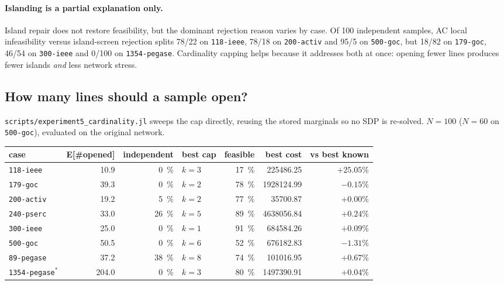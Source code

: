 \documentclass[11pt]{article}
\newcommand{\code}[1]{\texttt{\small #1}}
\begin{document}
\paragraph{Islanding is a partial explanation only.} Island repair does not restore feasibility, but the
dominant rejection reason varies by case. Of 100 independent samples, AC local infeasibility versus
island-screen rejection splits 78/22 on \code{118-ieee}, 78/18 on \code{200-activ} and 95/5 on
\code{500-goc}, but 18/82 on \code{179-goc}, 46/54 on \code{300-ieee} and 0/100 on \code{1354-pegase}.
Cardinality capping helps because it addresses both at once: opening fewer lines produces fewer islands
\emph{and} less network stress.

\subsection{How many lines should a sample open?}\label{sec:cardinality}

\code{scripts/experiment5\_cardinality.jl} sweeps the cap directly, reusing the stored marginals so no SDP
is re-solved. $N=100$ ($N=60$ on \code{500-goc}), evaluated on the original network.

\begin{table}[h]\centering
\begin{tabular}{lrrlrrr}
\toprule
case & E[\#opened] & independent & best cap & feasible & best cost & vs best known \\
\midrule
\code{118-ieee}  & 10.9 & \SI{0}{\percent}  & $k{=}3$ & \SI{17}{\percent} & \num{225486.25}  & $+25.05\%$ \\
\code{179-goc}   & 39.3 & \SI{0}{\percent}  & $k{=}2$ & \SI{78}{\percent} & \num{1928124.99} & $\mathbf{-0.15\%}$ \\
\code{200-activ} & 19.2 & \SI{5}{\percent}  & $k{=}2$ & \SI{77}{\percent} & \num{35700.87}   & $+0.00\%$ \\
\code{240-pserc} & 33.0 & \SI{26}{\percent} & $k{=}5$ & \SI{89}{\percent} & \num{4638056.84} & $+0.24\%$ \\
\code{300-ieee}  & 25.0 & \SI{0}{\percent}  & $k{=}1$ & \SI{91}{\percent} & \num{684584.26}  & $+0.09\%$ \\
\code{500-goc}   & 50.5 & \SI{0}{\percent}  & $k{=}6$ & \SI{52}{\percent} & \num{676182.83}  & $\mathbf{-1.31\%}$ \\
\code{89-pegase} & 37.2 & \SI{38}{\percent} & $k{=}8$ & \SI{74}{\percent} & \num{101016.95}  & $+0.67\%$ \\
\code{1354-pegase}$^{*}$ & 204.0 & \SI{0}{\percent} & $k{=}3$ & \SI{80}{\percent} & \num{1497390.91} & $+0.04\%$ \\
\bottomrule
\end{tabular}
\end{table}
\end{document}
